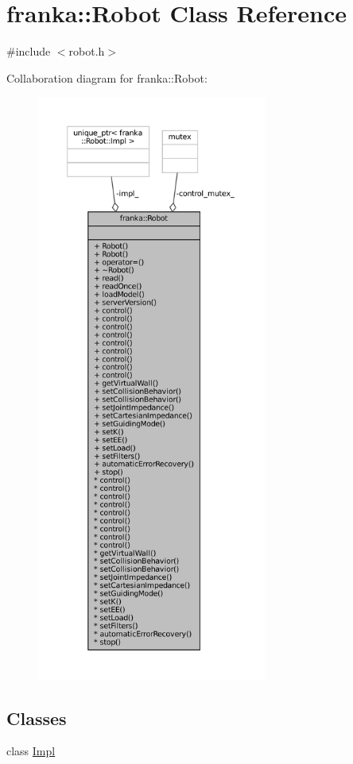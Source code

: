 \hypertarget{classfranka_1_1Robot}{}\section{franka\+:\+:Robot Class Reference}
\label{classfranka_1_1Robot}


{\ttfamily \#include $<$robot.\+h$>$}



Collaboration diagram for franka\+:\+:Robot\+:
\nopagebreak
\begin{figure}[H]
\begin{center}
\leavevmode
\includegraphics[height=550pt]{classfranka_1_1Robot__coll__graph}
\end{center}
\end{figure}
\subsection*{Classes}
\begin{DoxyCompactItemize}
\item 
class \hyperlink{classfranka_1_1Robot_1_1Impl}{Impl}
\end{DoxyCompactItemize}
